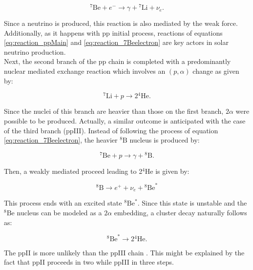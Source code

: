\documentclass[openany]{book}
\begin{document}
\begin{equation}  \label{eq:reaction_7Beelectron}
	{}^{7}\mathrm{Be} + e^{-} \rightarrow \gamma +  \mathrm{{}^{7}Li} + \nu_e.
\end{equation}

Since a neutrino is produced, this reaction is also mediated by the weak force. Additionally, as it happens with pp initial process, reactions of equations \ref{eq:reaction_ppMain} and \ref{eq:reaction_7Beelectron} are key actors in solar neutrino production.  \\

Next, the second branch of the pp chain is completed with a predominantly nuclear mediated exchange reaction which involves an $(p, \alpha)$ change as given by: 

\begin{equation}  \label{eq:reaction_7Lialpha}
	{}^{7}\mathrm{Li} + p  \rightarrow 2\mathrm{{}^{4}He}.
\end{equation}

Since the nuclei of this branch are heavier than those on the first branch, $2\alpha$ were possible to be produced. Actually, a similar outcome is anticipated with the case of the third branch  (ppIII). Instead of following the process of equation \ref{eq:reaction_7Beelectron}, the heavier $\mathrm{{}^{8}B}$ nucleus is produced by:

\begin{equation}  \label{eq:reaction_7Bep}
		{}^{7}\mathrm{Be}  + p \rightarrow \gamma +  \mathrm{{}^{8}B} .
\end{equation}

Then, a weakly mediated proceed leading to 2$\mathrm{{}^4He}$ is given by: 

\begin{equation} \label{eq:reaction_8Bpositron}
	{}^{8}\mathrm{B} \rightarrow e^{+} + \nu_e + 	{}^{8}\mathrm{{Be}^{*}}
\end{equation}

This process ends with an excited state ${}^{8}\mathrm{{Be}^{*}}$. Since this state is unstable and the $\mathrm{{}^{8}Be}$ nucleus can be modeled as a $2\alpha$ embedding, a cluster decay naturally follows as: 

\begin{equation} \label{eq:reaction_8Bdisintegration}
	{}^{8}\mathrm{{Be}^{*}} \rightarrow 2{}^{4}\mathrm{He}.
\end{equation}

The ppII is more unlikely than the ppIII chain \cite{bertulani_2003}. This might be explained by the fact that ppII proceeds in two  while ppIII in three steps. \\
\end{document}
